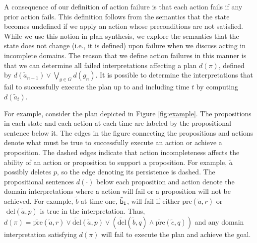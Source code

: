 \documentclass{article}
\begin{document}
A consequence of our definition of action failure is that each action fails if any prior action fails.  This definition follows from the semantics that the state becomes undefined if we apply an action whose preconditions are not satisfied.  While we use this notion in plan synthesis, we explore the semantics that the state does not change (i.e., it is defined) upon failure when we discuss acting in incomplete domains.  The reason that we define action failures in this manner is that we can determine all failed interpretations affecting a plan $d(\pi)$, defined  by  $d(\tilde{a}_{n-1}) \vee \bigvee_{g \in G} d(g_n)$.
%
It is possible to determine the interpretations that fail to successfully execute the plan up to and including time $t$ by computing $d(\tilde{a}_t)$.  

For example, consider the plan depicted in Figure \ref{fig:example}.  The propositions in each state and each action at each time are labeled by the propositional sentence below it. The edges in the figure connecting the propositions and actions denote what must be true to successfully execute an action or achieve a proposition.  The dashed edges indicate that action incompleteness affects the ability of an action or proposition to support a proposition.  For example, $\tilde{a}$ possibly deletes $p$, so the edge denoting its persistence is dashed.  The propositional sentences  $d(\cdot)$  below each proposition and action denote the domain interpretations where a action will fail or a proposition will not be achieved.  For example, $\tilde{b}$ at time one, ${\sf \tilde{b}_1}$, will fail if either $\text{pre}(\tilde{a}, r)$ or $\text{ del}(\tilde{a}, p)$ is true in the interpretation.  Thus, $d(\pi) = \widetilde{\text{pre}}(\tilde{a}, r) \vee \widetilde{\text{del}}(\tilde{a}, p)\vee
  (\widetilde{\text{del}}(\tilde{b}, q) \wedge \widetilde{\text{pre}}(\tilde{c}, q))$ and any domain interpretation satisfying $d(\pi)$ will fail to execute the plan and achieve the goal.
\end{document}
